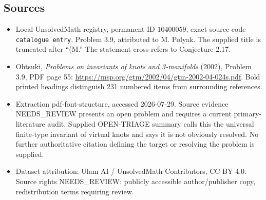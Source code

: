 \documentclass[11pt]{article}
\begin{document}
\subsection{Sources}
\begin{itemize}
\item Local UnsolvedMath registry, permanent ID \(10400059\), exact source code \texttt{catalogue entry}, Problem 3.9, attributed to M. Polyak. The supplied title is truncated after ``(M.'' The statement cross-refers to Conjecture 2.17.
\item Ohtsuki, \emph{Problems on invariants of knots and 3-manifolds} (2002), Problem 3.9, PDF page 55: \url{https://msp.org/gtm/2002/04/gtm-2002-04-024s.pdf}. Bold printed headings distinguish 231 numbered items from surrounding references.
\item Extraction pdf-font-structure, accessed 2026-07-29. Source evidence NEEDS\_REVIEW presents an open problem and requires a current primary-literature audit. Supplied OPEN-TRIAGE summary calls this the universal finite-type invariant of virtual knots and says it is not obviously resolved. No further authoritative citation defining the target or resolving the problem is supplied.
\item Dataset attribution: Ulam AI / UnsolvedMath Contributors, CC BY 4.0. Source rights NEEDS\_REVIEW: publicly accessible author/publisher copy, redistribution terms requiring review.
\end{itemize}
\end{document}

